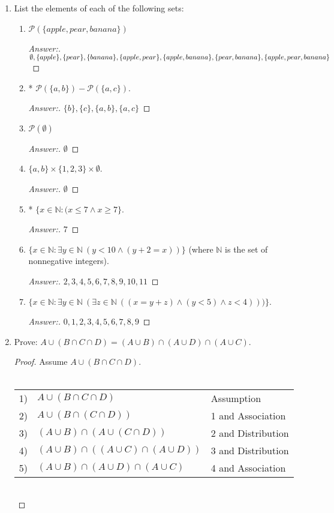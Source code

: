 \documentclass[10pt]{article}
\newcommand{\nat}{\mathbb{N}}
\begin{document}
\begin{enumerate}
\item
List the elements of each of the following sets:
\begin{enumerate}
\item
$\mathcal{P} (\{apple, pear, banana\})$
\begin{proof}[Answer:]
$\emptyset, \{apple\}, \{pear\}, \{banana\}, \{apple, pear\}, \{apple, banana\}, \{pear, banana\},\\ \{apple, pear, banana\}$
\end{proof}
\item
* $\mathcal{P} (\{a, b\}) - \mathcal{P} (\{a, c\})$.
\begin{proof}[Answer:]
$\{b\}, \{c\}, \{a, b\}, \{a, c\}$
\end{proof}
\item
$\mathcal{P} (\emptyset)$
\begin{proof}[Answer:]
$\emptyset$
\end{proof}
\item
$\{a, b\} \times \{1, 2, 3\} \times \emptyset$.
\begin{proof}[Answer:]
$\emptyset$
\end{proof}
\item
* $\{x \in \nat: (x \leq 7 \land x \geq 7\}$.
\begin{proof}[Answer:]
$7$
\end{proof}
\item
$\{x \in \nat: \exists y \in \nat \> (y < 10 \land (y + 2 = x))\}$ (where $\nat$ is the set of nonnegative integers).
\begin{proof}[Answer:]
$2, 3, 4, 5, 6, 7, 8, 9, 10, 11$
\end{proof}
\item
$\{x \in \nat: \exists y \in \nat \> (\exists z \in \nat \> ((x = y + z) \land (y < 5) \land z < 4)))\}$.
\begin{proof}[Answer:]
$0, 1, 2, 3, 4, 5, 6, 7, 8, 9$
\end{proof}
\end{enumerate}



\pagebreak
\item
Prove: $A \cup (B \cap C \cap D) = (A \cup B) \cap (A \cup D) \cap (A \cup C)$.
\begin{proof}
Assume $A \cup (B \cap C \cap D)$. \\ \\
\begin{tabular}{r l l}
1) & $A \cup (B \cap C \cap D)$ & Assumption \\
2) & $A \cup (B \cap (C \cap D))$ & 1 and Association \\
3) & $(A \cup B) \cap (A \cup (C \cap D))$ & 2 and Distribution \\
4) & $(A \cup B) \cap ((A \cup C) \cap (A \cup D))$  & 3 and Distribution \\
5) & $(A \cup B) \cap (A \cup D) \cap (A \cup C)$ & 4 and Association \\
\end{tabular} \\
\end{proof}



\end{enumerate}
\end{document}
